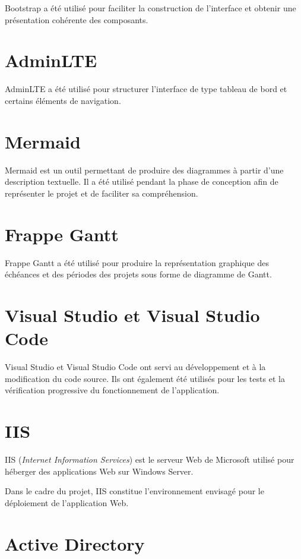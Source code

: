 \documentclass[12pt,a4paper,oneside]{report}
\begin{document}
Bootstrap a été utilisé pour faciliter la construction de l'interface et obtenir une présentation cohérente des composants.

\section{AdminLTE}

AdminLTE a été utilisé pour structurer l'interface de type tableau de bord et certains éléments de navigation.

\section{Mermaid}

Mermaid est un outil permettant de produire des diagrammes à partir d'une description textuelle. Il a été utilisé pendant la phase de conception afin de représenter le projet et de faciliter sa compréhension.

\section{Frappe Gantt}

Frappe Gantt a été utilisé pour produire la représentation graphique des échéances et des périodes des projets sous forme de diagramme de Gantt.

\section{Visual Studio et Visual Studio Code}

Visual Studio et Visual Studio Code ont servi au développement et à la modification du code source. Ils ont également été utilisés pour les tests et la vérification progressive du fonctionnement de l'application.

\section{IIS}

IIS (\textit{Internet Information Services}) est le serveur Web de Microsoft utilisé pour héberger des applications Web sur Windows Server.

Dans le cadre du projet, IIS constitue l'environnement envisagé pour le déploiement de l'application Web.

\section{Active Directory}
\end{document}
